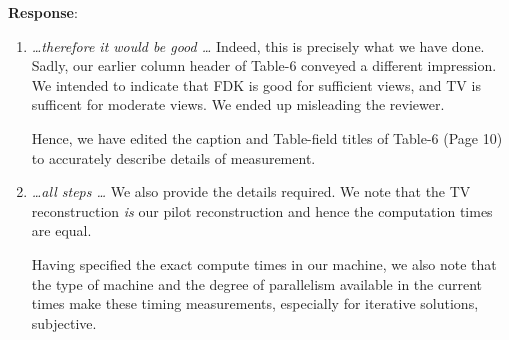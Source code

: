 \documentclass[11pt]{article}
\begin{document}
\textbf{Response}:

\begin{enumerate}

\item \emph{ \ldots therefore it would be good \ldots } Indeed, this
  is precisely what we have done.  Sadly, our earlier column header of
  Table-6 conveyed a different impression. We intended to indicate
  that FDK is good for sufficient views, and TV is sufficent for
  moderate views. We ended up misleading the reviewer.
  
  Hence, we have edited the caption and Table-field titles of Table-6
  (Page 10) to accurately describe details of measurement. 

\item \emph{ \ldots all steps \ldots} We also provide the details
  required.  We note that the TV reconstruction \emph{is} our pilot
  reconstruction and hence the computation times are equal.

  Having specified the exact compute times in our machine, we also
  note that the type of machine and the degree of parallelism
  available in the current times make these timing measurements,
  especially for iterative solutions, subjective.

\end{enumerate}
\end{document}
